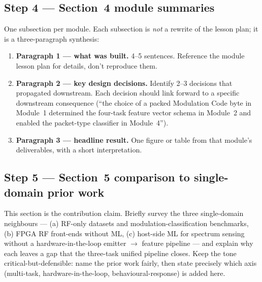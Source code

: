 \documentclass[11pt,letterpaper]{article}
\begin{document}
\subsection{Step 4 --- Section~4 module summaries}
One subsection per module. Each subsection is \emph{not} a rewrite of the lesson plan; it is a three-paragraph synthesis:
\begin{enumerate}[leftmargin=2em]
	\item \textbf{Paragraph 1 --- what was built.} 4--5 sentences. Reference the module lesson plan for details, don't reproduce them.
	\item \textbf{Paragraph 2 --- key design decisions.} Identify 2--3 decisions that propagated downstream. Each decision should link forward to a specific downstream consequence (``the choice of a packed Modulation Code byte in Module~1 determined the four-task feature vector schema in Module~2 and enabled the packet-type classifier in Module~4'').
	\item \textbf{Paragraph 3 --- headline result.} One figure or table from that module's deliverables, with a short interpretation.
\end{enumerate}

\subsection{Step 5 --- Section~5 comparison to single-domain prior work}
This section is the contribution claim. Briefly survey the three single-domain neighbours --- (a) RF-only datasets and modulation-classification benchmarks, (b) FPGA RF front-ends without ML, (c) host-side ML for spectrum sensing without a hardware-in-the-loop emitter $\to$ feature pipeline --- and explain why each leaves a gap that the three-task unified pipeline closes. Keep the tone critical-but-defensible: name the prior work fairly, then state precisely which axis (multi-task, hardware-in-the-loop, behavioural-response) is added here.
\end{document}

